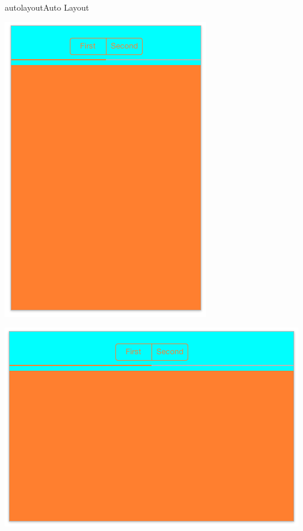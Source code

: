 \documentclass[parskip=half, final]{scrreprt}
\begin{document}
\begin{lecture}
\begin{exc}
\begin{excitem}{autolayout}{Auto Layout}
\begin{enumerate}
\begin{minipage}{.5\linewidth}
  \centering
  \includegraphics[width=\linewidth, height=\linewidth, keepaspectratio]{img/al_21.png}
\end{minipage}
\begin{minipage}{.5\linewidth}
  \centering
  \includegraphics[width=\linewidth, height=\linewidth, keepaspectratio]{img/al_22.png}
\end{minipage}


\end{enumerate}
\end{excitem}
\end{exc}
\end{lecture}
\end{document}
